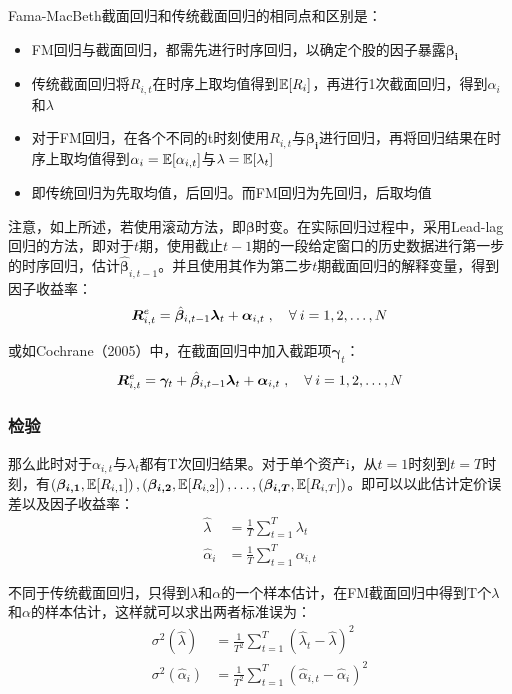 \documentclass[11pt]{article}
\begin{document}
Fama-MacBeth截面回归和传统截面回归的相同点和区别是：
\begin{itemize}
    \item FM回归与截面回归，都需先进行时序回归，以确定个股的因子暴露$\bm{\beta_i}$
    \item 传统截面回归将$R_{i,t}$在时序上取均值得到$\mathbb{E}[R_i]$，再进行1次截面回归，得到$\alpha_i$和$\lambda$
    \item 对于FM回归，在各个不同的t时刻使用$R_{i,t}$与$\bm{\beta_{i}}$进行回归，再将回归结果在时序上取均值得到$\alpha_i = \mathbb{E}[\alpha_{i,t}]$与$\lambda=\mathbb{E}[\lambda_t]$
    \item 即传统回归为先取均值，后回归。而FM回归为先回归，后取均值
\end{itemize}

注意，如上所述，若使用滚动方法，即$\bm{\beta}$时变。在实际回归过程中，采用Lead-lag回归的方法，即对于$t$期，使用截止$t-1$期的一段给定窗口的历史数据进行第一步的时序回归，估计$\hat{\bm{\beta}}_{i,t-1}$。并且使用其作为第二步$t$期截面回归的解释变量，得到因子收益率：
\begin{equation*}
    \bm{R}_{i,t}^{e} = \hat{\bm{\beta}}_{i,t-1} \bm{\lambda}_t + \bm{\alpha}_{i,t} \inlinesep \forall i=1,2,\dots,N
\end{equation*}

或如Cochrane（2005）中，在截面回归中加入截距项$\bm{\gamma}_t$：
\begin{equation*}
    \bm{R}_{i,t}^{e} = \bm{\gamma}_t + \hat{\bm{\beta}}_{i,t-1} \bm{\lambda}_t + \bm{\alpha}_{i,t} \inlinesep \forall i=1,2,\dots,N
\end{equation*}

\subsubsection{检验}

那么此时对于$\alpha_{i,t}$与$\lambda_t$都有T次回归结果。对于单个资产i，从$t=1$时刻到$t=T$时刻，有$\left(\bm{\beta_{i,1}},\mathbb{E}[R_{i,1}]\right),\left(\bm{\beta_{i,2}},\mathbb{E}[R_{i,2}]\right),\dots,\left(\bm{\beta_{i,T}},\mathbb{E}[R_{i,T}]\right)$。即可以以此估计定价误差以及因子收益率：
\begin{align*}
    \hat{\lambda} &= \frac{1}{T} \sum_{t=1}^{T} \lambda_t \\
    \hat{\alpha}_i &= \frac{1}{T} \sum_{t=1}^{T} \alpha_{i,t}
\end{align*}

不同于传统截面回归，只得到$\lambda$和$\alpha$的一个样本估计，在FM截面回归中得到T个$\lambda$和$\alpha$的样本估计，这样就可以求出两者标准误为：
\begin{align*}
    \sigma^2(\hat{\lambda}) &= \frac{1}{T^2} \sum_{t=1}^{T} \left( \hat{\lambda}_t - \hat{\lambda} \right)^2 \\
    \sigma^2(\hat{\alpha}_i) &= \frac{1}{T^2} \sum_{t=1}^{T} \left( \hat{\alpha}_{i,t} - \hat{\alpha}_i \right)^2
\end{align*}
\end{document}
